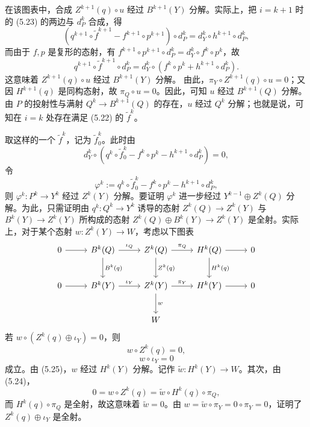 在该图表中，合成 $Z^{k+1}(q)\circ u$ 经过 $B^{k+1}(Y)$ 分解。实际上，把 $i=k+1$ 时的 (5.23) 的两边与 $d_P^k$ 合成，得
\[
  (q^{k+1}\circ\tilde f^{k+1}-f^{k+1}\circ p^{k+1})\circ d_P^k=d_Y^k\circ h^{k+1}\circ d_P^k,
\]
而由于 $f, p$ 是复形的态射，有 $f^{k+1}\circ p^{k+1}\circ d_P^k=d_Y^k\circ f^k\circ p^k$，故
\[
  q^{k+1}\circ\tilde f^{k+1}\circ d_P^k=d_Y^k\circ(f^k\circ p^k+h^{k+1}\circ d_P^k).
\]
这意味着 $Z^{k+1}(q)\circ u$ 经过 $B^{k+1}(Y)$ 分解。
由此，$\pi_Y\circ Z^{k+1}(q)\circ u=0$；又因 $H^{k+1}(q)$ 是同构态射，故 $\pi_Q\circ u=0$。因此，可知 $u$ 经过 $B^{k+1}(Q)$ 分解。由 $P$ 的投射性与满射 $Q^k\to B^{k+1}(Q)$ 的存在，$u$ 经过 $Q^k$ 分解；也就是说，可知在 $i=k$ 处存在满足 (5.22) 的 $\tilde f^k$。


取这样的一个 $\tilde f^k$，记为 $\tilde f_0^k$。此时由
\[
  d_Y^k\circ(q^k\circ\tilde f_0^k-f^k\circ p^k-h^{k+1}\circ d_P^k)=0,
\]
令
\[
  \varphi^k:=q^k\circ\tilde f_0^k-f^k\circ p^k-h^{k+1}\circ d_P^k,
\]
则 $\varphi^k\colon P^k\to Y^k$ 经过 $Z^k(Y)$ 分解。要证明 $\varphi^k$ 进一步经过 $Y^{k-1}\oplus Z^k(Q)$ 分解。为此，只需证明由 $q^k\colon Q^k\to Y^k$ 诱导的态射 $Z^k(Q)\to Z^k(Y)$ 与 $B^k(Y)\to Z^k(Y)$ 所构成的态射 $Z^k(Q)\oplus B^k(Y)\to Z^k(Y)$ 是全射。实际上，对于某个态射 $w\colon Z^k(Y)\to W$，考虑以下图表
\[\begin{tikzcd}[row sep=2.4em, column sep=2.6em]
0 \arrow[r] & B^k(Q) \arrow[r,"\iota_Q"] \arrow[d,"B^k(q)"] & Z^k(Q) \arrow[r,"\pi_Q"] \arrow[d,"Z^k(q)"] & H^k(Q) \arrow[r] \arrow[d,"H^k(q)"] & 0\\
0 \arrow[r] & B^k(Y) \arrow[r,"\iota_Y"] & Z^k(Y) \arrow[r,"\pi_Y"] \arrow[d,"w"] & H^k(Y) \arrow[r] & 0\\
 & & W & &
\end{tikzcd}\]
若 $w\circ(Z^k(q)\oplus\iota_Y)=0$，则
\begin{equation}
  w\circ Z^k(q)=0, \tag{5.24}
\end{equation}
\begin{equation}
  w\circ\iota_Y=0 \tag{5.25}
\end{equation}
成立。由 (5.25)，$w$ 经过 $H^k(Y)$ 分解。记作 $\tilde w\colon H^k(Y)\to W$。其次，由 (5.24)，
\[
  0=w\circ Z^k(q)=\tilde w\circ H^k(q)\circ\pi_Q,
\]
而 $H^k(q)\circ\pi_Q$ 是全射，故这意味着 $\tilde w=0$。由 $w=\tilde w\circ\pi_Y=0\circ\pi_Y=0$，证明了 $Z^k(q)\oplus\iota_Y$ 是全射。

